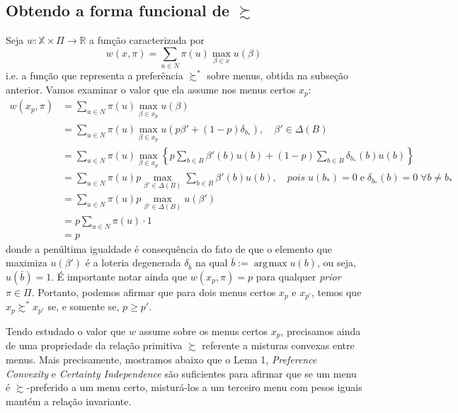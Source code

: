 \documentclass[11pt, a4paper]{article}
\theoremstyle{nonumberplain}
\theoremstyle{plain}
\theoremstyle{plain}
\theoremstyle{plain}
\DeclareMathOperator*{\argmax}{\arg\!\max}
\begin{document}
\subsection{Obtendo a forma funcional de $\succsim$}
Seja $w:\mathbb{X}\times \Pi\rightarrow \mathbb{R}$ a função caracterizada por $$w(x,\pi)=\sum_{u\in N} \pi(u)\max_{\beta\in x}u(\beta)$$ i.e. a função que representa a preferência $\succsim^*$ sobre menus, obtida na subseção anterior. Vamos examinar o valor que ela assume nos menus certos $x_p$:
\begin{align*}
w(x_p,\pi)&=\sum_{u\in N} \pi(u)\max_{\beta\in x_{p}}u(\beta)\\
&= \sum_{u\in N} \pi(u)\max_{\beta\in x_{p}}u(p\beta'+(1-p)\delta_{b_*}),\quad \beta'\in \Delta(B)\\
&=\sum_{u\in N} \pi(u)\max_{\beta\in x_{p}}\left\lbrace p \sum_{b\in B}\beta'(b)u(b)+(1-p)\sum_{b\in B}\delta_{b_*}(b)u(b)\right\rbrace \\
&=\sum_{u\in N} \pi(u)p\max_{\beta'\in \Delta(B)}\sum_{b\in B}\beta'(b)u(b), \quad pois \; u(b_*)=0\; \text{e}\; \delta_{b_*}(b)=0\; \forall b\neq b_*\\
&= \sum_{u\in N} \pi(u) p \max_{\beta'\in \Delta(B)} u(\beta')\\
&= p\sum_{u\in N}\pi(u)\cdot 1\\
&=p
\end{align*}
donde a penúltima igualdade é consequência do fato de que o elemento que maximiza $u(\beta')$ é a loteria degenerada $\delta_{\bar{b}}$ na qual $\bar{b}:=\argmax u(b)$, ou seja, $u(\bar{b})=1$. É importante notar ainda que $w(x_p,\pi)=p$ para qualquer \textit{prior} $\pi\in\Pi$. Portanto, podemos afirmar que para dois menus certos $x_p$ e $x_{p'}$, temos que $x_p\succsim^* x_{p'}$ se, e somente se, $p\geq p'$. 

Tendo estudado o valor que $w$ assume sobre os menus certos $x_p$, precisamos ainda de uma propriedade da relação primitiva $\succsim$ referente a misturas convexas entre menus. Mais precisamente, mostramos abaixo que o Lema 1, \emph{Preference Convexity} e \emph{Certainty Independence} são suficientes para afirmar que se um menu é $\succsim$-preferido a um menu certo, misturá-los a um terceiro menu com pesos iguais mantém a relação invariante.  
\end{document}
